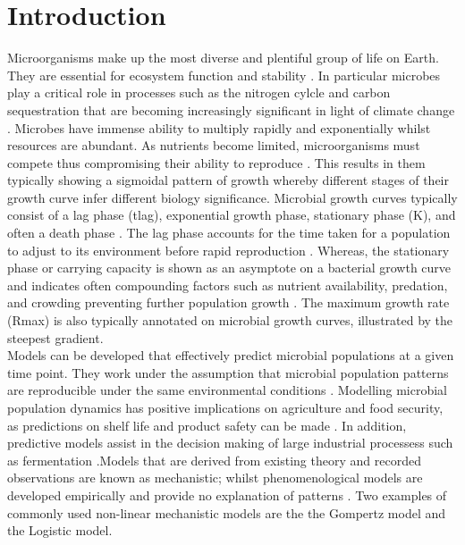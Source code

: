 \documentclass[12pt]{article}
\begin{document}
  \section{Introduction}
  \linenumbers
Microorganisms make up the most diverse and plentiful group of life on Earth. They are essential for ecosystem function and stability \cite{Shoemaker2021}. In particular microbes play a critical role in processes such as the nitrogen cylcle and carbon sequestration that are becoming increasingly significant in light of climate change \cite{Gupta2016}. Microbes have immense ability to multiply rapidly and exponentially whilst resources are abundant. As nutrients become limited, microorganisms must compete thus compromising their ability to reproduce \cite{NatRevMicro}. This results in them typically showing a sigmoidal pattern of growth whereby different stages of their growth curve infer different biology significance. Microbial growth curves typically consist of a lag phase (tlag), exponential growth phase, stationary phase (K), and often a death phase \cite{Zwietering1990}. The lag phase accounts for the time taken for a population to adjust to its environment before rapid reproduction \cite{BUCHANAN1997313}. Whereas, the stationary phase or carrying capacity is shown as an asymptote on a bacterial growth curve and indicates often compounding factors such as nutrient availability, predation, and crowding preventing further population growth \cite{WACHENHEIM2003157}. The maximum growth rate (Rmax) is also typically annotated on microbial growth curves, illustrated by the steepest gradient.\\
     
Models can be developed that effectively predict microbial populations at a given time point. They work under the assumption that microbial population patterns are reproducible under the same environmental conditions \cite{Pla2015}. Modelling microbial population dynamics has positive implications on agriculture and food security, as predictions on shelf life and product safety can be made \cite{Zwietering1990}. In addition, predictive models assist in the decision making of large industrial processess such as fermentation \cite{Garcia2021}.Models that are derived from existing theory and recorded observations are known as mechanistic; whilst phenomenological models are developed empirically and provide no explanation of patterns \cite{doi:10.1080/10408398.2011.570463}. Two examples of commonly used non-linear mechanistic models are the the Gompertz model and the Logistic model.\\
\end{document}
